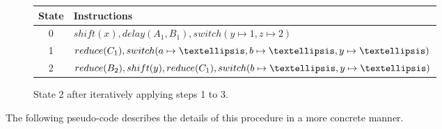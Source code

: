 \documentclass[a4paper,11pt]{article}
\begin{document}
\begin{figure}[!ht]
\vspace{1\baselineskip}
\centering
{}

\vspace{.5\baselineskip}
\small{\begin{tabular}{|c|l|}
  \hline
  \textbf{State} & \textbf{Instructions} \\
  \hline
  0 & $shift(x), delay(A_1, B_1), switch(y \mapsto 1, z \mapsto 2)$ \\
  1 & $reduce(C_1), switch(a \mapsto \textellipsis, b \mapsto \textellipsis, y \mapsto \textellipsis)$ \\ 
  2 & $reduce(B_2), shift(y), reduce(C_1), switch(b \mapsto \textellipsis, y \mapsto \textellipsis)$ \\  
  \hline
\end{tabular}}
\caption{State 2 after iteratively applying steps 1 to 3.}
\end{figure}

\clearpage
The following pseudo-code describes the details of this procedure in a more concrete manner.
\end{document}
